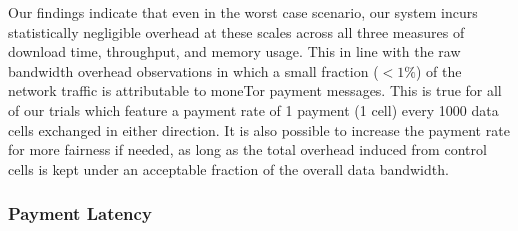 Our findings indicate that even in the worst case scenario, our system incurs
statistically negligible overhead at these scales across all three measures of
download time, throughput, and memory usage. This in line with the raw bandwidth
overhead observations in which a small fraction ($< 1\%$) of the network traffic
is attributable to moneTor payment messages. This is true for all of our trials
which feature a payment rate of 1 payment (1 cell) every 1000 data cells
exchanged in either direction. It is also possible to increase the payment rate
for more fairness if needed, as long as the total overhead induced from control
cells is kept under an acceptable fraction of the overall data bandwidth.


\subsubsection{Payment Latency}

